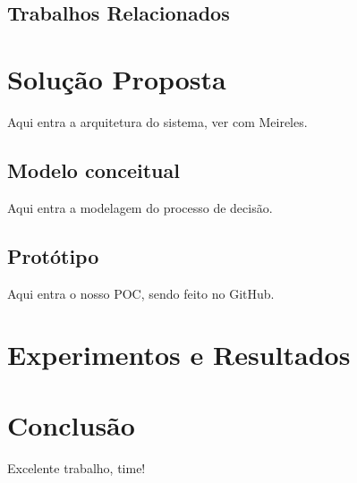 \documentclass[pfc]{imetex}
\begin{document}
\section{Trabalhos Relacionados}

\label{relacionados}


\chapter{Solução Proposta}
\label{solucao}
Aqui entra a arquitetura do sistema, ver com Meireles.\
\begin{center}
    \noindent{}
\end{center}

\section{Modelo conceitual}
\label{modelo}
Aqui entra a modelagem do processo de decisão.

\section{Protótipo}
\label{prototipo}
Aqui entra o nosso POC, sendo feito no GitHub.

\chapter{Experimentos e Resultados}
\label{experimentos}

\chapter{Conclusão}
\label{conclusao}

Excelente trabalho, time!
\end{document}
